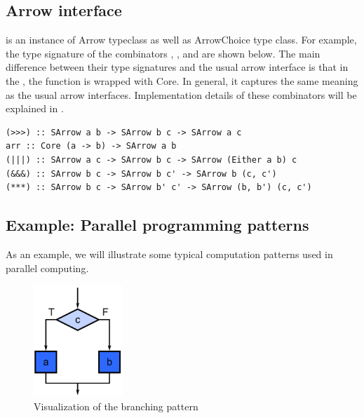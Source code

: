 \subsection{Arrow interface}
 is an instance of Arrow typeclass as well as ArrowChoice type class. For example, the type signature of the combinators \hask{>>>}, \hask{|||}, \hask{&&&} and  are shown below. The main difference between their type signatures and the usual arrow interface is that in the , the function is wrapped with Core. In general, it captures the same meaning as the usual arrow interfaces. Implementation details of these combinators will be explained in .
\begin{code}
\begin{verbatim}
(>>>) :: SArrow a b -> SArrow b c -> SArrow a c
arr :: Core (a -> b) -> SArrow a b
(|||) :: SArrow a c -> SArrow b c -> SArrow (Either a b) c
(&&&) :: SArrow b c -> SArrow b c' -> SArrow b (c, c')
(***) :: SArrow b c -> SArrow b' c' -> SArrow (b, b') (c, c')
\end{verbatim}
\end{code}
\subsection{Example: Parallel programming patterns}
As an example, we will illustrate some typical computation patterns used in parallel computing.
\begin{figure}[ht]
    \centering
    \includegraphics[width=0.3\textwidth]{arrow/select.png}
    \caption{Visualization of the branching pattern \cite{mccoolStructuredParallelPrograming2012}}
    \label{SArrow:fig:select}
\end{figure}


